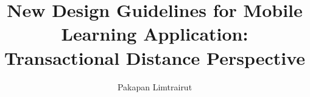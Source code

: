 \documentclass[12pt, a4paper, twoside, openright]{book}
\begin{document}
\frontmatter


\title{New Design Guidelines for Mobile Learning Application: Transactional Distance Perspective}
\author{Pakapan Limtrairut}

\subject{Computer Engineer}

\phd







\maketitle



\tableofcontents



\mainmatter








%


\end{document}
